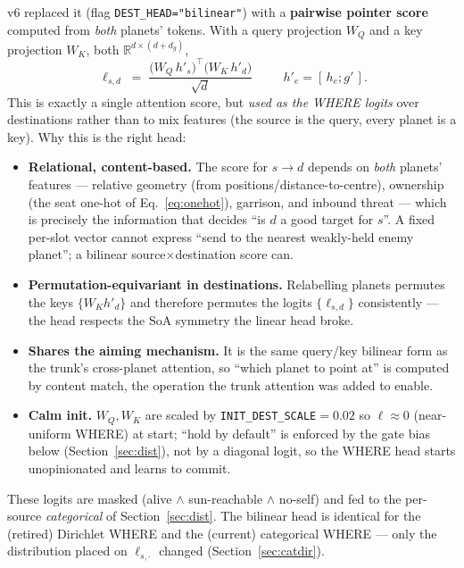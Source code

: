 \documentclass[11pt]{article}
\newcommand{\R}{\mathbb{R}}
\newcommand{\cd}[1]{\texttt{#1}}
\begin{document}
v6 replaced it (flag \cd{DEST\_HEAD="bilinear"}) with a \textbf{pairwise pointer score} computed from
\emph{both} planets' tokens. With a query projection $W_Q$ and a key projection $W_K$, both
$\R^{d\times(d+d_g)}$,
\begin{equation}
\boxed{\ \ell_{s,d}\;=\;\frac{\big(W_Q\,h'_s\big)^{\!\top}\big(W_K\,h'_d\big)}{\sqrt{d}}\ \ }
\qquad h'_e=[\,h_e;g'\,].
\label{eq:bilinear}
\end{equation}
This is exactly a single attention score, but \emph{used as the WHERE logits} over destinations rather
than to mix features (the source is the query, every planet is a key). Why this is the right head:
\begin{itemize}[nosep,leftmargin=1.6em]
\item \textbf{Relational, content-based.} The score for $s\!\to\!d$ depends on \emph{both} planets'
  features --- relative geometry (from positions/distance-to-centre), ownership (the seat one-hot of
  Eq.~\eqref{eq:onehot}), garrison, and inbound threat --- which is precisely the information that
  decides ``is $d$ a good target for $s$''. A fixed per-slot vector cannot express ``send to the
  nearest weakly-held enemy planet''; a bilinear source$\times$destination score can.
\item \textbf{Permutation-equivariant in destinations.} Relabelling planets permutes the keys
  $\{W_K h'_d\}$ and therefore permutes the logits $\{\ell_{s,d}\}$ consistently --- the head respects
  the SoA symmetry the linear head broke.
\item \textbf{Shares the aiming mechanism.} It is the same query/key bilinear form as the trunk's
  cross-planet attention, so ``which planet to point at'' is computed by content match, the operation the
  trunk attention was added to enable.
\item \textbf{Calm init.} $W_Q,W_K$ are scaled by \cd{INIT\_DEST\_SCALE}$=0.02$ so $\ell\approx0$
  (near-uniform WHERE) at start; ``hold by default'' is enforced by the gate bias below
  (Section~\ref{sec:dist}), not by a diagonal logit, so the WHERE head starts unopinionated and learns
  to commit.
\end{itemize}
These logits are masked (alive $\wedge$ sun-reachable $\wedge$ no-self) and fed to the per-source
\emph{categorical} of Section~\ref{sec:dist}. The bilinear head is identical for the (retired) Dirichlet
WHERE and the (current) categorical WHERE --- only the distribution placed on $\ell_{s,\cdot}$ changed
(Section~\ref{sec:catdir}).
\end{document}
